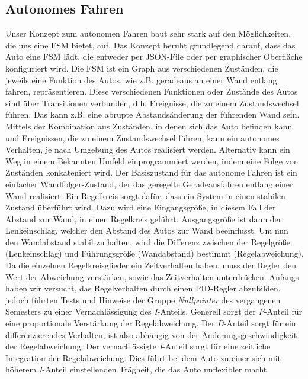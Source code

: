 \subsection{Autonomes Fahren}
Unser Konzept zum autonomen Fahren baut sehr stark auf den Möglichkeiten, die uns eine FSM bietet, auf. 
Das Konzept beruht grundlegend darauf, dass das Auto eine FSM lädt, die entweder per JSON-File oder per graphischer Oberfläche konfiguriert wird. Die FSM ist ein Graph aus verschiedenen Zuständen, die jeweils eine Funktion des Autos, wie z.B. geradeaus an einer Wand entlang fahren, repräsentieren. Diese verschiedenen Funktionen oder Zustände des Autos sind über Transitionen verbunden, d.h. Ereignisse, die zu einem Zustandswechsel führen. Das kann z.B. eine abrupte Abstandsänderung der führenden Wand sein.
\newline 
Mittels der Kombination aus Zuständen, in denen sich das Auto befinden kann und Ereignissen, die zu einem Zustandswechsel führen, kann ein autonomes Verhalten, je nach Umgebung des Autos realisiert werden. Alternativ kann ein Weg in einem Bekannten Umfeld einprogrammiert werden, indem eine Folge von Zuständen konkateniert wird. 
Der Basiszustand für das autonome Fahren ist ein einfacher Wandfolger-Zustand, der das geregelte Geradeausfahren entlang einer Wand realisiert. 
\newline
\newline
Ein Regelkreis sorgt dafür, dass ein System in einen stabilen Zustand überführt wird. Dazu wird eine Eingangsgröße, in diesem Fall der Abstand zur Wand, in einen Regelkreis geführt. Ausgangsgröße ist dann der Lenkeinschlag, welcher den Abstand des Autos zur Wand beeinflusst. Um nun den Wandabstand stabil zu halten, wird die Differenz zwischen der Regelgröße (Lenkeinschlag) und Führungsgröße (Wandabstand) bestimmt (Regelabweichung). Da die einzelnen Regelkreisglieder ein Zeitverhalten haben, muss der Regler den Wert der Abweichung verstärken, sowie das Zeitverhalten unterdrücken. 
Anfangs haben wir versucht, das Regelverhalten durch einen PID-Regler abzubilden, jedoch führten Tests und Hinweise der Gruppe \textit{Nullpointer} des vergangenen Semesters zu einer Vernachlässigung des \textit{I}-Anteils. Generell sorgt der \textit{P}-Anteil für eine proportionale Verstärkung der Regelabweichung. Der \textit{D}-Anteil sorgt für ein differenzierendes Verhalten, ist also abhängig von der Änderungsgeschwindigkeit der Regelabweichung.
Der vernachlässigte \textit{I}-Anteil sorgt für eine zeitliche Integration der Regelabweichung. Dies führt bei dem Auto zu einer sich mit höherem \textit{I}-Anteil einstellenden Trägheit, die das Auto unflexibler macht.

